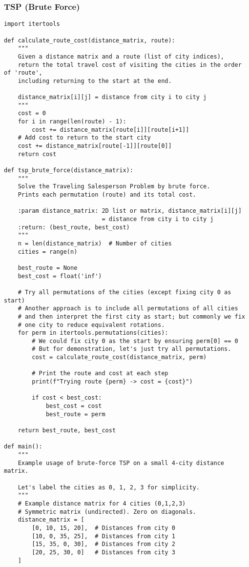 \documentclass[a4paper,12pt]{article}
\begin{document}
\subsubsection{TSP (Brute Force)}
\begin{lstlisting}[style=pythonstyle]
import itertools

def calculate_route_cost(distance_matrix, route):
    """
    Given a distance matrix and a route (list of city indices),
    return the total travel cost of visiting the cities in the order of 'route',
    including returning to the start at the end.
    
    distance_matrix[i][j] = distance from city i to city j
    """
    cost = 0
    for i in range(len(route) - 1):
        cost += distance_matrix[route[i]][route[i+1]]
    # Add cost to return to the start city
    cost += distance_matrix[route[-1]][route[0]]
    return cost

def tsp_brute_force(distance_matrix):
    """
    Solve the Traveling Salesperson Problem by brute force.
    Prints each permutation (route) and its total cost.
    
    :param distance_matrix: 2D list or matrix, distance_matrix[i][j] 
                            = distance from city i to city j
    :return: (best_route, best_cost)
    """
    n = len(distance_matrix)  # Number of cities
    cities = range(n)

    best_route = None
    best_cost = float('inf')

    # Try all permutations of the cities (except fixing city 0 as start)
    # Another approach is to include all permutations of all cities
    # and then interpret the first city as start; but commonly we fix
    # one city to reduce equivalent rotations.
    for perm in itertools.permutations(cities):
        # We could fix city 0 as the start by ensuring perm[0] == 0
        # But for demonstration, let's just try all permutations.
        cost = calculate_route_cost(distance_matrix, perm)

        # Print the route and cost at each step
        print(f"Trying route {perm} -> cost = {cost}")

        if cost < best_cost:
            best_cost = cost
            best_route = perm

    return best_route, best_cost

def main():
    """
    Example usage of brute-force TSP on a small 4-city distance matrix.
    
    Let's label the cities as 0, 1, 2, 3 for simplicity.
    """
    # Example distance matrix for 4 cities (0,1,2,3)
    # Symmetric matrix (undirected). Zero on diagonals.
    distance_matrix = [
        [0, 10, 15, 20],  # Distances from city 0
        [10, 0, 35, 25],  # Distances from city 1
        [15, 35, 0, 30],  # Distances from city 2
        [20, 25, 30, 0]   # Distances from city 3
    ]


\end{lstlisting}
\end{document}
